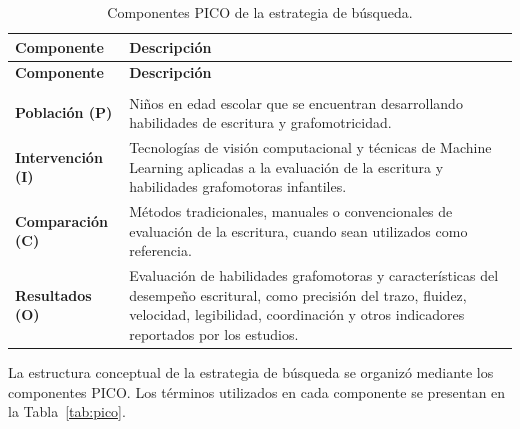 \documentclass{iaesarticle}
\renewcommand{\arraystretch}{1.3}
\begin{document}
\begingroup
\small
\renewcommand{\arraystretch}{1.3}
\setlength{\tabcolsep}{3pt}
\setlength{\LTleft}{0pt}
\setlength{\LTright}{0pt}
\begin{longtable}{|%
>{\raggedright\arraybackslash}p{3.5cm}|%
>{\raggedright\arraybackslash}p{\dimexpr\textwidth-3.5cm-4\tabcolsep\relax}|}
\caption{Componentes PICO de la estrategia de búsqueda.}
\label{tab:pico-resumen}\\
\hline
\rowcolor{blue!10}
\textbf{Componente} & \textbf{Descripción} \\
\hline
\endfirsthead

\hline
\rowcolor{blue!10}
\textbf{Componente} & \textbf{Descripción} \\
\hline
\endhead

\hline
\multicolumn{2}{r|}{\textit{Continúa en la siguiente página}} \\
\endfoot

\hline
\endlastfoot

\textbf{Población (P)} &
Niños en edad escolar que se encuentran desarrollando habilidades de escritura y grafomotricidad. \\
\hline

\textbf{Intervención (I)} &
Tecnologías de visión computacional y técnicas de Machine Learning aplicadas a la evaluación de la escritura y habilidades grafomotoras infantiles. \\
\hline

\textbf{Comparación (C)} &
Métodos tradicionales, manuales o convencionales de evaluación de la escritura, cuando sean utilizados como referencia. \\
\hline

\textbf{Resultados (O)} &
Evaluación de habilidades grafomotoras y características del desempeño escritural, como precisión del trazo, fluidez, velocidad, legibilidad, coordinación y otros indicadores reportados por los estudios. \\
\hline

\end{longtable}
\endgroup

La estructura conceptual de la estrategia de búsqueda se organizó mediante los componentes PICO. Los términos utilizados en cada componente se presentan en la Tabla~\ref{tab:pico}.
\end{document}
